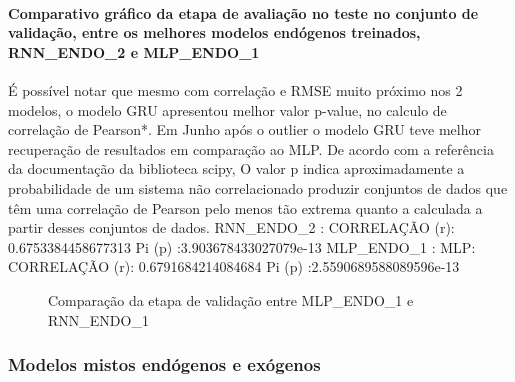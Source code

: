 \documentclass[	12pt, Times, openright, twoside, a4paper, english, brazil]{abntex2}
\begin{document}
                \paragraph{Comparativo gráfico da etapa de avaliação no teste no conjunto de validação, entre os melhores modelos endógenos treinados, RNN\_ENDO\_2 e MLP\_ENDO\_1}
                  É possível notar que mesmo com correlação e RMSE muito próximo nos 2 modelos, o modelo GRU apresentou melhor valor p-value, no calculo de correlação de Pearson*. Em Junho após o outlier o modelo GRU teve melhor recuperação de resultados em comparação ao MLP.
                  De acordo com a referência da documentação da biblioteca scipy, O valor p indica aproximadamente a probabilidade de um sistema não correlacionado produzir conjuntos de dados que têm uma correlação de Pearson pelo menos tão extrema quanto a calculada a partir desses conjuntos de dados.\newline
                  RNN\_ENDO\_2 : CORRELAÇÃO (r): 0.6753384458677313 Pi (p) :3.903678433027079e-13\newline
                  MLP\_ENDO\_1 : MLP: CORRELAÇÃO (r): 0.6791684214084684 Pi (p) :2.5590689588089596e-13\newline
                  \begin{figure}[!ht]
                      \caption{Comparação da etapa de validação entre MLP\_ENDO\_1 e RNN\_ENDO\_1 \label{fig:case1_gru_mlp_val_analise} }
                    \end{figure}

    	    \subsubsection{Modelos mistos endógenos e exógenos}
\end{document}
